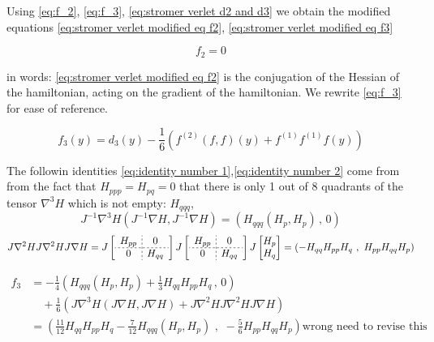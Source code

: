 \documentclass[12pt]{article}
\begin{document}
Using \eqref{eq:f_2}, \eqref{eq:f_3}, \eqref{eq:stromer verlet d2 and d3} we obtain the modified equations \eqref{eq:stromer verlet modified eq f2}, \eqref{eq:stromer verlet modified eq f3}

\begin{equation}\label{eq:stromer verlet modified eq f2}
    f_2 = 0
\end{equation}

in words: \eqref{eq:stromer verlet modified eq f2} is the conjugation of the Hessian of the hamiltonian, acting on the gradient of the hamiltonian. We rewrite \eqref{eq:f_3} for ease of reference.

$$f_3(y) = d_3(y) - \frac{1}{6}\left( f^{(2)} (f , f)(y) + f^{(1)} f^{(1)} f(y) \right)$$

The followin identities \eqref{eq:identity number 1},\eqref{eq:identity number 2} come from from the fact that $H_{ppp} = H_{pq} = 0$ that there is only 1 out of 8 quadrants of the tensor $\nabla^3H$ which is not empty: $H_{qqq}$, 
\begin{equation}\label{eq:identity number 1}
    J^{-1}\nabla^3 H(J^{-1}\nabla H,J^{-1}\nabla H) = (H_{qqq}(H_p,H_p) \,,\, 0)
\end{equation}
\begin{equation}\label{eq:identity number 2}
    J\nabla^2HJ\nabla^2HJ\nabla H = J\left[\begin{array}{c;{2pt/2pt}c} H_{pp} & 0 \\ \hdashline[2pt/2pt] 0 & H_{qq}\end{array}\right] J\left[\begin{array}{c;{2pt/2pt}c} H_{pp} & 0 \\ \hdashline[2pt/2pt] 0 & H_{qq}\end{array} \right] J \begin{bmatrix} H_p \\ H_q \end{bmatrix}
    = \left( -H_{qq}H_{pp}H_q\,\,,\,\, H_{pp}H_{qq}H_p \right)
\end{equation}

\begin{equation}\label{eq:stromer verlet modified eq f3}
\begin{split}
    f_3 & = -\frac{1}{4}\left( H_{qqq}(H_p,H_p) + \frac{1}{3}H_{qq}H_{pp}H_q \,,\, 0\right)\\
    &\quad +\frac{1}{6} \left(J\nabla^3 H(J\nabla H,J\nabla H) + J\nabla^2HJ\nabla^2HJ\nabla H \right)\\
    & = \left( \frac{11}{12}H_{qq}H_{pp}H_q -\frac{7}{12} H_{qqq}(H_p,H_p) \,\,,\,\, - \frac{5}{6}H_{pp}H_{qq}H_p \right)  \text{wrong need to revise this}
\end{split}
\end{equation}
\end{document}
